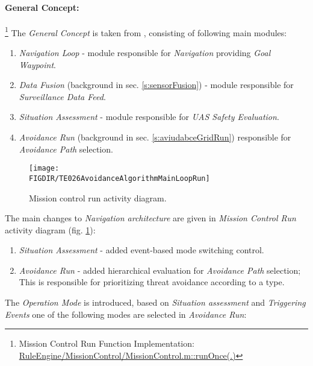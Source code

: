 \newpage
\paragraph{General Concept:}\footnote{Mission Control Run Function Implementation: \url{RuleEngine/MissionControl/MissionControl.m::runOnce(.)}} The \emph{General Concept} is taken from  \cite{sabatini2014navigation,Sabatini2014}, consisting of following main modules:
\begin{enumerate}
    \item \emph{Navigation Loop} - module responsible for \emph{Navigation} providing \emph{Goal Waypoint}.
    
    \item \emph{Data Fusion} (background in sec. \ref{s:sensorFusion}) - module responsible for \emph{Surveillance Data Feed}.
    
    \item \emph{Situation Assessment} - module responsible for \emph{UAS Safety Evaluation}. 
    
    \item \emph{Avoidance Run} (background in sec. \ref{s:aviudabceGridRun}) responsible for \emph{Avoidance Path} selection.    
\end{enumerate}


\begin{figure}[H]
    \centering
    \texttt{[image: \\FIGDIR/TE026AvoidanceAlgorithmMainLoopRun]}
    \caption{Mission control run activity diagram.}
    \label{fig:missionControlRunActivityDiagram}
\end{figure}

\noindent The main changes to \emph{Navigation architecture} are given in \emph{Mission Control Run} activity diagram (fig. \ref{fig:missionControlRunActivityDiagram}):

\begin{enumerate}
    \item \emph{Situation Assessment} - added event-based mode switching control. 
   
    \item \emph{Avoidance Run} - added hierarchical evaluation for \emph{Avoidance Path} selection; This is responsible for prioritizing threat avoidance according to a type. 
\end{enumerate}

\noindent The \emph{Operation Mode} is introduced, based on \emph{Situation assessment} and \emph{Triggering Events} one of the following modes are selected in \emph{Avoidance Run}:

